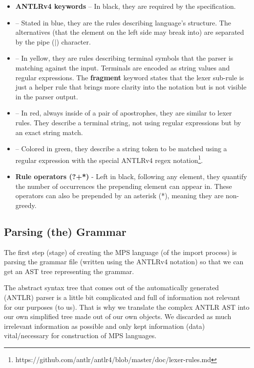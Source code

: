 \begin{itemize}
	\item \textbf{ANTLRv4 keywords} -- In black, they are required by the specification.
	\item {} -- Stated in blue, they are the rules describing language's structure.
		The alternatives (that the element on the left side may break into) are separated by the pipe ($|$) character.
	\item {} -- In yellow, they are rules describing terminal symbols that the parser is matching against the input.
		Terminals are encoded as string values and regular expressions.
		The \textbf{fragment} keyword states that the lexer sub-rule is just a helper rule that brings more clarity into the notation but is not visible in the parser output.
	\item {} -- In red, always inside of a pair of apostrophes, they are similar to lexer rules.
		They describe a terminal string, not using regular expressions but by an exact string match.
	\item {} -- Colored in green, they describe a string token to be matched using a regular expression with the special ANTLRv4 regex notation\footnote{https://github.com/antlr/antlr4/blob/master/doc/lexer-rules.md}.
	\item \textbf{Rule operators (?+*)} - Left in black, following any element, they quantify the number of occurrences the prepending element can appear in.
		These operators can also be prepended by an asterisk (*), meaning they are non-greedy.
\end{itemize}

\subsection{Parsing (the) Grammar}

The first step (stage) of creating the MPS language (of the import process) is parsing the grammar file (written using the ANTLRv4 notation) so that we can get an AST tree representing the grammar.

The abstract syntax tree that comes out of the automatically generated (ANTLR) parser is a little bit complicated and full of information not relevant for our purposes (to us).
That is why we translate the complex ANTLR AST into our own simplified tree made out of our own objects.
We discarded as much irrelevant information as possible and only kept information (data) vital/necessary for construction of MPS languages.

